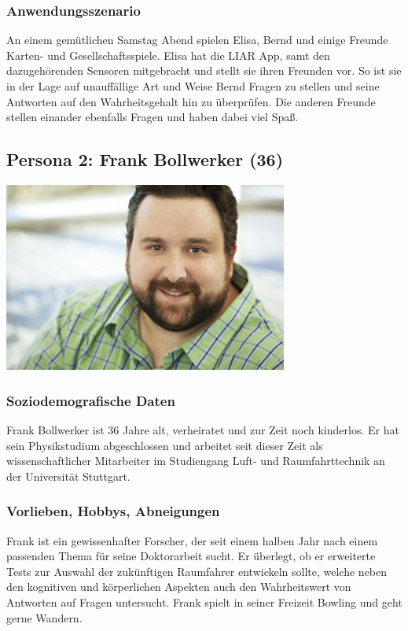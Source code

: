 \documentclass[10pt, a4paper, oneside, titlepage]{scrartcl} %
\begin{document}
	\subsubsection{Anwendungsszenario}
	An einem gemütlichen Samstag Abend spielen Elisa, Bernd und einige Freunde Karten- und Gesellschaftsspiele. Elisa hat die LIAR App, samt den dazugehörenden Sensoren mitgebracht und stellt sie ihren Freunden vor. So ist sie in der Lage auf unauffällige Art und Weise Bernd Fragen zu stellen und seine Antworten auf den Wahrheitsgehalt hin zu überprüfen. Die anderen Freunde stellen einander ebenfalls Fragen und haben dabei viel Spaß.
   
   	\subsection{Persona 2: Frank Bollwerker (36)}
   	\begin{center}
		\includegraphics[width=0.7\textwidth]{persona_02.jpg}
	\end{center}
	\subsubsection{Soziodemografische Daten}
	Frank Bollwerker ist 36 Jahre alt, verheiratet und zur Zeit noch kinderlos. Er hat sein Physikstudium abgeschlossen und arbeitet seit dieser Zeit als wissenschaftlicher Mitarbeiter im Studiengang Luft- und Raumfahrttechnik an der Universität Stuttgart.
	\subsubsection{Vorlieben, Hobbys, Abneigungen}
	Frank ist ein gewissenhafter Forscher, der seit einem halben Jahr nach einem passenden Thema für seine Doktorarbeit sucht. Er überlegt, ob er erweiterte Tests zur Auswahl der zukünftigen Raumfahrer entwickeln sollte, welche neben den kognitiven und körperlichen Aspekten auch den Wahrheitswert von Antworten auf Fragen untersucht. Frank spielt in seiner Freizeit Bowling und geht gerne Wandern.
\end{document}
